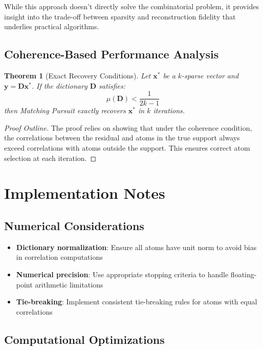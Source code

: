 \documentclass[12pt]{article}
\newtheorem{theorem}{Theorem}[section]
\begin{document}
While this approach doesn't directly solve the combinatorial problem, it provides insight into the trade-off between sparsity and reconstruction fidelity that underlies practical algorithms.

\subsection{Coherence-Based Performance Analysis}

\begin{theorem}[Exact Recovery Conditions]\label{thm:exact_recovery}
    Let $\mathbf{x}^*$ be a $k$-sparse vector and $\mathbf{y} = \mathbf{D}\mathbf{x}^*$. If the dictionary $\mathbf{D}$ satisfies:
    \begin{equation}
        \mu(\mathbf{D}) < \frac{1}{2k-1}
    \end{equation}
    then Matching Pursuit exactly recovers $\mathbf{x}^*$ in $k$ iterations.
\end{theorem}

\begin{proof}[Proof Outline]
    The proof relies on showing that under the coherence condition, the correlations between the residual and atoms in the true support always exceed correlations with atoms outside the support. This ensures correct atom selection at each iteration.
\end{proof}

\section{Implementation Notes}

\subsection{Numerical Considerations}

\begin{itemize}
    \item \textbf{Dictionary normalization}: Ensure all atoms have unit norm to avoid bias in correlation computations
    \item \textbf{Numerical precision}: Use appropriate stopping criteria to handle floating-point arithmetic limitations
    \item \textbf{Tie-breaking}: Implement consistent tie-breaking rules for atoms with equal correlations
\end{itemize}

\subsection{Computational Optimizations}
\end{document}

